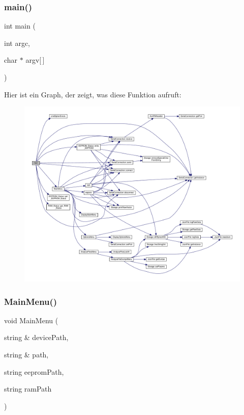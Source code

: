 \subsubsection{main()}
{\footnotesize\ttfamily int main (\begin{DoxyParamCaption}\item[{int}]{argc,  }\item[{char $\ast$}]{argv[$\,$] }\end{DoxyParamCaption})}

Hier ist ein Graph, der zeigt, was diese Funktion aufruft\+:
\nopagebreak
\begin{figure}[H]
\begin{center}
\leavevmode
\includegraphics[width=350pt]{_jura_coffee_memory_8cpp_a0ddf1224851353fc92bfbff6f499fa97_cgraph}
\end{center}
\end{figure}
\mbox{\label{_jura_coffee_memory_8cpp_a738ac361f7823bd523c2b86533ed2b67}} 
\subsubsection{Main\+Menu()}
{\footnotesize\ttfamily void Main\+Menu (\begin{DoxyParamCaption}\item[{string \&}]{device\+Path,  }\item[{string \&}]{path,  }\item[{string}]{eeprom\+Path,  }\item[{string}]{ram\+Path }\end{DoxyParamCaption})}

